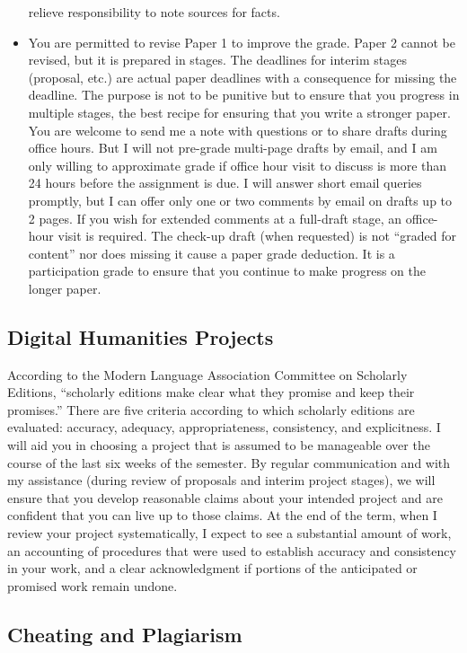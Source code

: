 \documentclass[]{article}
\begin{document}
\begin{itemize}
  relieve responsibility to note sources for facts.
\item
  You are permitted to revise Paper 1 to improve the grade. Paper 2
  cannot be revised, but it is prepared in stages. The deadlines for
  interim stages (proposal, etc.) are actual paper deadlines with a
  consequence for missing the deadline. The purpose is not to be
  punitive but to ensure that you progress in multiple stages, the best
  recipe for ensuring that you write a stronger paper. You are welcome
  to send me a note with questions or to share drafts during office
  hours. But I will not pre-grade multi-page drafts by email, and I am
  only willing to approximate grade if office hour visit to discuss is
  more than 24 hours before the assignment is due. I will answer short
  email queries promptly, but I can offer only one or two comments by
  email on drafts up to 2 pages. If you wish for extended comments at a
  full-draft stage, an office-hour visit is required. The check-up draft
  (when requested) is not ``graded for content'' nor does missing it
  cause a paper grade deduction. It is a participation grade to ensure
  that you continue to make progress on the longer paper.
\end{itemize}

\subsection{Digital Humanities
Projects}\label{digital-humanities-projects}

According to the Modern Language Association Committee on Scholarly
Editions, ``scholarly editions make clear what they promise and keep
their promises.'' There are five criteria according to which scholarly
editions are evaluated: accuracy, adequacy, appropriateness,
consistency, and explicitness. I will aid you in choosing a project that
is assumed to be manageable over the course of the last six weeks of the
semester. By regular communication and with my assistance (during review
of proposals and interim project stages), we will ensure that you
develop reasonable claims about your intended project and are confident
that you can live up to those claims. At the end of the term, when I
review your project systematically, I expect to see a substantial amount
of work, an accounting of procedures that were used to establish
accuracy and consistency in your work, and a clear acknowledgment if
portions of the anticipated or promised work remain undone.

\subsection{Cheating and Plagiarism}\label{cheating-and-plagiarism}
\end{document}
